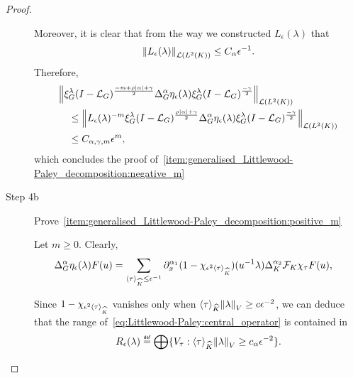 \begin{proof}
\begin{description}
            Moreover,
            it is clear that from the way we constructed $L_\epsilon(\lambda)$ that
            \begin{align*}
                \norm [\Lin {\Lebesgue 2 \CompactGroup}] {L_\epsilon(\lambda)} \leq C_\alpha \epsilon^{-1}.
            \end{align*}
            Therefore,
            \begin{align*}
                &\norm [\Lin {\Lebesgue 2 \CompactGroup}] {%
                    \Rep \lambda \BesselPotential {-m + \rho \abs\alpha + \gamma}
                    \DifferenceOperatorOrder \alpha \eta_\epsilon(\lambda)
                    \Rep \lambda \BesselPotential {-\gamma}
                }\\
                &\quad \leq \norm [\Lin {\Lebesgue 2 \CompactGroup}] {%
                    L_\epsilon(\lambda)^{-m}
                    \Rep \lambda \BesselPotential {\rho \abs \alpha + \gamma}
                    \DifferenceOperatorOrder \alpha \eta_\epsilon(\lambda)
                    \Rep \lambda \BesselPotential {-\gamma}
                }\\
                &\quad \leq C_{\alpha, \gamma, m} \epsilon^{m},
            \end{align*}
            which concludes the proof of~\ref{item:generalised_Littlewood-Paley_decomposition:negative_m}

        \item [Step 4b] Prove~\ref{item:generalised_Littlewood-Paley_decomposition:positive_m}

            Let $m \geq 0$.
            Clearly,
            \begin{align*}
                \DifferenceOperatorOrder \alpha \eta_\epsilon(\lambda) F(u)
                &= \sum_{\JapaneseBracket \CompactGroup \tau \leq \epsilon^{-1}}
                \iD {x^{\alpha_1} } (1 - \chi_{\epsilon^2 \JapaneseBracket \CompactGroup \tau})(u^{-1} \lambda)
                \DifferenceOperatorOrder [\CompactGroup] {\alpha_2} \Fourier [\CompactGroup] \chi_\tau F(u),
            \end{align*}

            Since $1 - \chi_{\epsilon^2 \JapaneseBracket \CompactGroup \tau}$ vanishes only when $\JapaneseBracket \CompactGroup \tau \norm \lambda \geq c \epsilon^{-2}$,
            we can deduce that the range of~\eqref{eq:Littlewood-Paley:central_operator} is contained in
            \begin{align*}
                R_\epsilon(\lambda) \defeq \bigoplus \{V_\tau : \JapaneseBracket \CompactGroup \tau \norm \lambda \geq c_\alpha \epsilon^{-2} \}.
            \end{align*}


\end{description}
\end{proof}
